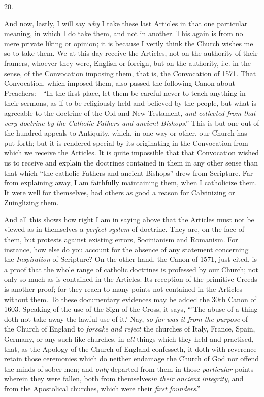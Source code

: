 20.

And now, lastly, I will say \emph{why} I take
these last Articles in that one particular meaning, in which I do take
them, and not in another. This again is from no mere private liking or
opinion; it is because I verily think the Church wishes me so to take
them. We at this day receive the Articles, not on the authority of
their framers, whoever they were, English or foreign, but on the
authority, i.e. in the sense, of the Convocation imposing them, that
is, the Convocation of 1571. That Convocation, which imposed them,
also passed the following Canon about Preachers:—``In the first
place, let them be careful never to teach anything in their sermons,
as if to be religiously held and believed by the people, but what is
agreeable to the doctrine of the Old and New Testament, \emph{and
collected from that very doctrine by the Catholic Fathers and ancient
Bishops}.'' This is but one out of the hundred appeals to Antiquity,
which, in one way or other, our Church has put forth; but it is
rendered special by its originating in the Convocation from which we
receive the Articles. It is quite impossible that that Convocation
wished us to receive and explain the doctrines contained in them in
any other sense than that which ``the catholic Fathers and ancient
Bishops'' drew from Scripture. Far from explaining away, I am
faithfully maintaining them, when I catholicize them. It were well for
themselves, had others as good a reason for Calvinizing or Zuinglizing
them.

And all this shows how right I am in saying above
that the Articles must not be viewed as in themselves a \emph{perfect
system} of doctrine. They are, on the face of them, but protests
against existing errors, Socinianism and Romanism. For instance, how
else do you account for the absence of any statement concerning the \emph{Inspiration}
of Scripture? On the other hand, the Canon of 1571, just cited, is a
proof that the whole range of catholic doctrines is professed by our
Church; not only so much as is contained in the Articles. Its
reception of the primitive Creeds is another proof; for they reach to
many points not contained in the Articles without them. To these
documentary evidences may be added the 30th Canon of 1603. Speaking of
the use of the Sign of the Cross, it says, ``'The abuse of a thing doth
not take away the lawful use of it.' Nay, \emph{so far was it from the
purpose} of the Church of England to \emph{forsake and reject} the
churches of Italy, France, Spain, Germany, or any such like churches,
in \emph{all} things which they held and practised, that, as the
Apology of the Church of England confesseth, it doth with reverence
retain those ceremonies which do neither endamage the Church of God
nor offend the minds of sober men; and \emph{only} departed from them
in those \emph{particular} points wherein they were fallen, both from
themselves\emph{in their ancient integrity}, and from the Apostolical
churches, which were their \emph{first founders}.''


